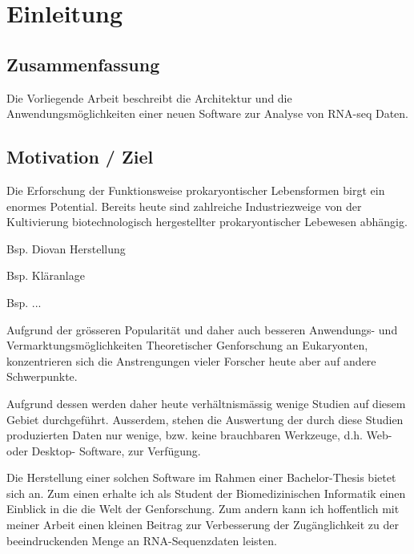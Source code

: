 \documentclass[a4paper]{thesis}
\begin{document}

\tableofcontents
\listoftodos
\newpage

\section{Einleitung}

\subsection{Zusammenfassung}

Die Vorliegende Arbeit beschreibt die Architektur und die
Anwendungs\-möglichkeiten einer neuen Software zur Analyse von RNA-seq Daten.

\subsection{Motivation / Ziel}

Die Erforschung der Funktionsweise prokaryontischer Lebensformen birgt ein
enormes Potential. Bereits heute sind zahlreiche Industriezweige von der
Kultivierung biotechnologisch hergestellter prokaryontischer Lebewesen
abhängig.

\begin{list}{-}{}
 \item Bsp. Diovan Herstellung
 \item Bsp. Kläranlage
 \item Bsp. ... 
\end{list}

Aufgrund der grösseren Popularität und daher auch besseren
Anwendungs- und Vermarktungsmöglichkeiten Theoretischer Genforschung an
Eukaryonten, konzentrieren sich die Anstrengungen vieler Forscher heute
aber auf andere Schwerpunkte.

Aufgrund dessen werden daher heute verhältnismässig wenige Studien auf diesem
Gebiet durchgeführt. Ausserdem, stehen die Auswertung der durch diese Studien
produzierten Daten nur wenige, bzw. keine brauchbaren Werkzeuge, d.h.
Web- oder Desktop- Software, zur Verfügung.

Die Herstellung einer solchen Software im Rahmen einer Bachelor-Thesis
bietet sich an. Zum einen erhalte ich als Student der Biomedizinischen
Informatik einen Einblick in die die Welt der Genforschung. Zum andern kann ich
hoffentlich mit meiner Arbeit einen kleinen Beitrag zur Verbesserung der
Zugänglichkeit zu der beeindruckenden Menge an RNA-Sequenzdaten leisten.
\end{document}
